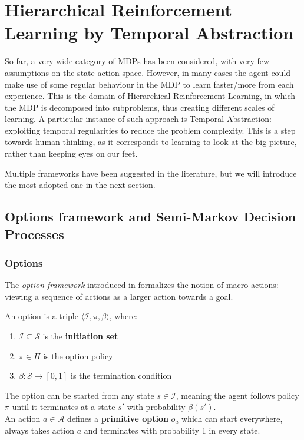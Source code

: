 
\chapter{Hierarchical Reinforcement Learning by Temporal Abstraction} %
\label{Chapter3}

So far, a very wide category of MDPs has been considered, with very few assumptions on the state-action space. However, in many cases the agent could make use of some regular behaviour in the MDP to learn faster/more from each experience. This is the domain of Hierarchical Reinforcement Learning, in which the MDP is decomposed into subproblems, thus creating different scales of learning. A particular instance of such approach is Temporal Abstraction: exploiting temporal regularities to reduce the problem complexity. This is a step towards human thinking, as it corresponds to learning to look at the big picture, rather than keeping eyes on our feet.

Multiple frameworks have been suggested in the literature, but we will introduce the most adopted one in the next section.

\section{Options framework and Semi-Markov Decision Processes}

\subsection{Options}
\label{subsec:options}

The \emph{option framework} introduced in \citep{sutton_between_1999} formalizes the notion of macro-actions: viewing a sequence of actions as a larger action towards a goal.

\begin{defi}[Options]
  An option is a triple $\langle \mathcal{I}, \pi, \beta \rangle$, where:
  \begin{enumerate}
  \item $\mathcal{I} \subseteq \mathcal{S}$ is the \textbf{initiation set}
  \item $\pi \in \Pi$ is the option policy
  \item $\beta: \mathcal{S} \to [0, 1]$ is the termination condition
  \end{enumerate}
  The option can be started from any state $s \in \mathcal{I}$, meaning the agent follows policy $\pi$ until it terminates at a state $s'$ with probability $\beta(s')$.\\
  An action $a \in \mathcal{A}$ defines a \textbf{primitive option} $o_a$ which can start everywhere, always takes action $a$ and terminates with probability 1 in every state.
\end{defi}

